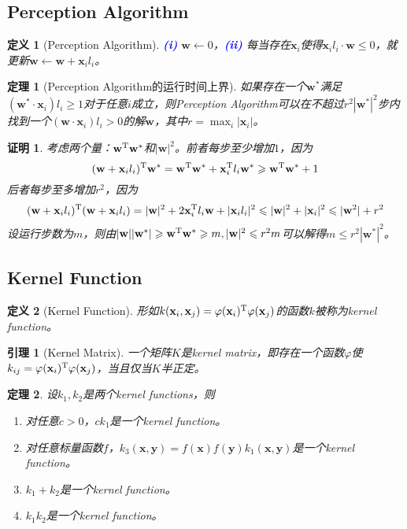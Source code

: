 \documentclass[8pt]{article}
\theoremstyle{compact}
\newtheorem{theorem}{定理}
\newtheorem{lemma}{引理}
\newtheorem{definition}{定义}
\newtheorem{Proof}{证明}
\def\num#1{\textnormal{\textbf{\mbox{\textcolor{blue}{(#1)}}}}}
\def\le{\leqslant}
\def\ge{\geqslant}
\begin{document}
\subsection{Perception Algorithm}
\begin{definition}[Perception Algorithm]
	\num{i} $\mathbf w \gets 0$，\num{ii} 每当存在$\mathbf x_i$使得$\mathbf x_il_i \cdot \mathbf w \le 0$，就更新$\mathbf w \gets \mathbf w + \mathbf x_il_i$。
\end{definition}
\begin{theorem}[Perception Algorithm的运行时间上界]
	如果存在一个$\mathbf w^*$满足$(\mathbf w^* \cdot \mathbf x_i)l_i \ge 1$对于任意$i$成立，则Perception Algorithm可以在不超过$r^2|\mathbf w^*|^2$步内找到一个$(\mathbf w \cdot \mathbf x_i)l_i > 0$的解$\mathbf w$，其中$r = \max_{i}|\mathbf x_i|$。
\end{theorem}
\begin{Proof}
	考虑两个量：$\mathbf w^\text T\mathbf w^*$和$|\mathbf w|^2$。前者每步至少增加$1$，因为
	\begin{equation}
	(\mathbf w + \mathbf x_il_i)^{\text T}\mathbf w^* = \mathbf w^\text T\mathbf w^* + \mathbf x_i^{\text T}l_i\mathbf w^*  \ge \mathbf w^\text T\mathbf w^* + 1
	\end{equation}
	后者每步至多增加$r^2$，因为
	\begin{equation}
	(\mathbf w + \mathbf x_il_i)^\text T(\mathbf w + \mathbf x_il_i) = |\mathbf w|^2 + 2\mathbf x_i^{\text T}l_i\mathbf w + |\mathbf x_il_i|^2 \le |\mathbf w|^2 + |\mathbf x_i|^2 \le |\mathbf w^2| + r^2
	\end{equation}
	设运行步数为$m$，则由$|\mathbf w||\mathbf w^*| \ge \mathbf w^\text T\mathbf w^* \ge m, |\mathbf w|^2 \le r^2m$可以解得$m \le r^2|\mathbf w^*|^2$。
	
\end{Proof}
\subsection{Kernel Function}
\begin{definition}[Kernel Function]
	形如$k(\mathbf x_i, \mathbf x_j) = \varphi(\mathbf x_i)^{\text T}\varphi(\mathbf x_j)$的函数$k$被称为kernel function。
\end{definition}
\begin{lemma}[Kernel Matrix]
	一个矩阵$K$是kernel matrix，即存在一个函数$\varphi$使$k_{ij} = \varphi(\mathbf x_i)^{\text T}\varphi(\mathbf x_j)$，当且仅当$K$半正定。
\end{lemma}
\begin{theorem}
	设$k_1, k_2$是两个kernel functions，则\begin{enumerate}
		\item 对任意$c > 0$，$ck_1$是一个kernel function。
		\item 对任意标量函数$f$，$k_3(\mathbf x, \mathbf y) = f(\mathbf x)f(\mathbf y)k_1(\mathbf x, \mathbf y)$是一个kernel function。
		\item $k_1 + k_2$是一个kernel function。
		\item $k_1k_2$是一个kernel function。
	\end{enumerate}
\end{theorem}
\end{document}
